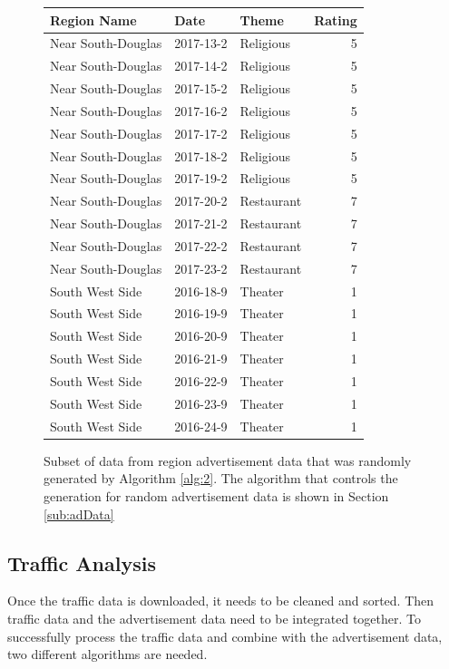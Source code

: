 \documentclass[titlepage,twocolumn]{article}
\begin{document}
\begin{figure}[h]
	\centering
	\footnotesize
	\begin{tabular}{|l|l|l|r|}
		\hline
		Region Name & Date & Theme & Rating \\
		\hline
		Near South-Douglas & 2017-13-2 & Religious & 5 \\
		Near South-Douglas & 2017-14-2 & Religious & 5 \\
		Near South-Douglas & 2017-15-2 & Religious & 5 \\
		Near South-Douglas & 2017-16-2 & Religious & 5 \\
		Near South-Douglas & 2017-17-2 & Religious & 5 \\
		Near South-Douglas & 2017-18-2 & Religious & 5 \\
		Near South-Douglas & 2017-19-2 & Religious & 5 \\
		Near South-Douglas & 2017-20-2 & Restaurant & 7 \\
		Near South-Douglas & 2017-21-2 & Restaurant & 7 \\
		Near South-Douglas & 2017-22-2 & Restaurant & 7 \\
		Near South-Douglas & 2017-23-2 & Restaurant & 7 \\
		South West Side & 2016-18-9 & Theater & 1 \\
		South West Side & 2016-19-9 & Theater & 1 \\
		South West Side & 2016-20-9 & Theater & 1 \\
		South West Side & 2016-21-9 & Theater & 1 \\
		South West Side & 2016-22-9 & Theater & 1 \\
		South West Side & 2016-23-9 & Theater & 1 \\
		South West Side & 2016-24-9 & Theater & 1 \\
		\hline
	\end{tabular}%
	\label{tab:regionAdsTable}%
	\caption{\small Subset of data from region advertisement data that was randomly generated by Algorithm \ref{alg:2}. The algorithm that controls the generation for random advertisement data is shown in Section \ref{sub:adData}}
\end{figure}%


\subsection{Traffic Analysis}

\par Once the traffic data is downloaded, it needs to be cleaned and sorted. Then traffic data and the advertisement data need to be integrated together. To successfully process the traffic data and combine with the advertisement data, two different algorithms are needed. 
\end{document}
